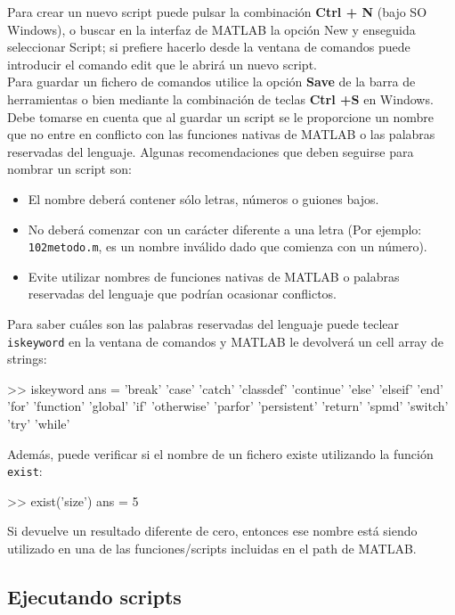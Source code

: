 Para crear un nuevo script puede pulsar la combinación \textbf{Ctrl + N}
(bajo SO Windows), o buscar en la interfaz de MATLAB la opción New y
enseguida seleccionar Script; si prefiere hacerlo desde la ventana de
comandos puede introducir el comando edit que le abrirá un nuevo script.\\

Para guardar un fichero de comandos utilice la opción \textbf{Save} de
la barra de herramientas o bien mediante la combinación de teclas
\textbf{Ctrl +S} en Windows. Debe tomarse en cuenta que al guardar un
script se le proporcione un nombre que no entre en conflicto con las
funciones nativas de MATLAB o las palabras reservadas del lenguaje.
Algunas recomendaciones que deben seguirse para nombrar un script son:

\begin{itemize}
\item
  El nombre deberá contener sólo letras, números o guiones bajos.
\item
  No deberá comenzar con un carácter diferente a una letra (Por ejemplo:
  \texttt{102metodo.m}, es un nombre inválido dado que comienza con un
  número).
\item
  Evite utilizar nombres de funciones nativas de MATLAB o palabras
  reservadas del lenguaje que podrían ocasionar conflictos.
\end{itemize}

Para saber cuáles son las palabras reservadas del lenguaje puede teclear
\texttt{iskeyword} en la ventana de comandos y MATLAB le devolverá un
cell array de strings:

\begin{matlab}
>> iskeyword
ans = 
    'break'
    'case'
    'catch'
    'classdef'
    'continue'
    'else'
    'elseif'
    'end'
    'for'
    'function'
    'global'
    'if'
    'otherwise'
    'parfor'
    'persistent'
    'return'
    'spmd'
    'switch'
    'try'
    'while'
\end{matlab}

Además, puede verificar si el nombre de un fichero existe utilizando la
función \texttt{exist}:

\begin{matlab}
>> exist('size')
ans =
     5
\end{matlab}

Si devuelve un resultado diferente de cero, entonces ese nombre está
siendo utilizado en una de las funciones/scripts incluidas en el path de
MATLAB.

\subsection{Ejecutando scripts}\label{ejecutando-scripts}

